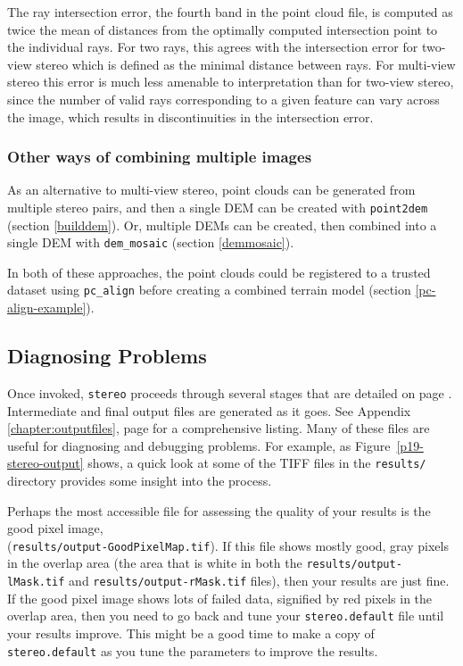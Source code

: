 The ray intersection error, the fourth band in the point cloud
file, is computed as twice the mean of distances from the optimally
computed intersection point to the individual rays. For two rays, this
agrees with the intersection error for two-view stereo which is defined
as the minimal distance between rays. For multi-view stereo this error
is much less amenable to interpretation than for two-view stereo, since the
number of valid rays corresponding to a given feature can vary across
the image, which results in discontinuities in the intersection error.

\subsubsection*{Other ways of combining multiple images}

As an alternative to multi-view stereo, point clouds can be generated
from multiple stereo pairs, and then a single DEM can be created with
\texttt{point2dem} (section \ref{builddem}). Or, multiple DEMs
can be created, then combined into a single DEM with \texttt{dem\_mosaic}
(section \ref{demmosaic}).

In both of these approaches, the point clouds could be registered
to a trusted dataset using \texttt{pc\_align} before creating a combined
terrain model (section \ref{pc-align-example}).

\subsection{Diagnosing Problems}

Once invoked, \texttt{stereo} proceeds through several stages that are
detailed on page \pageref{entrypoints}.  Intermediate and final output
files are generated as it goes.  See Appendix
\ref{chapter:outputfiles}, page \pageref{chapter:outputfiles} for a
comprehensive listing.  Many of these files are useful for diagnosing and
debugging problems.  For example, as Figure~\ref{p19-stereo-output}
shows, a quick look at some of the TIFF files in the \texttt{results/}
directory provides some insight into the process.

Perhaps the most accessible file for assessing the quality of your
results is the good pixel image, \\
(\texttt{results/output-GoodPixelMap.tif}).  If this file shows mostly
good, gray pixels in the overlap area (the area that is white in both
the \texttt{results/output-lMask.tif} and
\texttt{results/output-rMask.tif} files), then your results are just
fine.  If the good pixel image shows lots of failed data, signified by
red pixels in the overlap area, then you need to go back and tune your
\texttt{stereo.default} file until your results improve.  This might be
a good time to make a copy of \texttt{stereo.default} as you tune the
parameters to improve the results.

